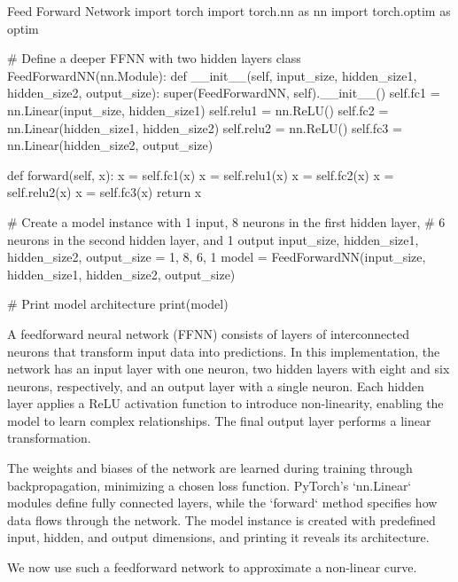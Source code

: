 \begin{codeonly}{Feed Forward Network}
import torch
import torch.nn as nn
import torch.optim as optim

# Define a deeper FFNN with two hidden layers
class FeedForwardNN(nn.Module):
    def __init__(self, input_size, hidden_size1, hidden_size2, output_size):
        super(FeedForwardNN, self).__init__()
        self.fc1 = nn.Linear(input_size, hidden_size1)
        self.relu1 = nn.ReLU()
        self.fc2 = nn.Linear(hidden_size1, hidden_size2)
        self.relu2 = nn.ReLU()
        self.fc3 = nn.Linear(hidden_size2, output_size)

    def forward(self, x):
        x = self.fc1(x)
        x = self.relu1(x)
        x = self.fc2(x)
        x = self.relu2(x)
        x = self.fc3(x)
        return x

# Create a model instance with 1 input, 8 neurons in the first hidden layer, 
# 6 neurons in the second hidden layer, and 1 output
input_size, hidden_size1, hidden_size2, output_size = 1, 8, 6, 1
model = FeedForwardNN(input_size, hidden_size1, hidden_size2, output_size)

# Print model architecture
print(model)
\end{codeonly}

A feedforward neural network (FFNN) consists of layers of interconnected neurons that transform input data into predictions. In this implementation, the network has an input layer with one neuron, two hidden layers with eight and six neurons, respectively, and an output layer with a single neuron. Each hidden layer applies a ReLU activation function to introduce non-linearity, enabling the model to learn complex relationships. The final output layer performs a linear transformation. 

The weights and biases of the network are learned during training through backpropagation, minimizing a chosen loss function. PyTorch's `nn.Linear` modules define fully connected layers, while the `forward` method specifies how data flows through the network. The model instance is created with predefined input, hidden, and output dimensions, and printing it reveals its architecture.

We now use such a feedforward network to approximate a non-linear curve. 

